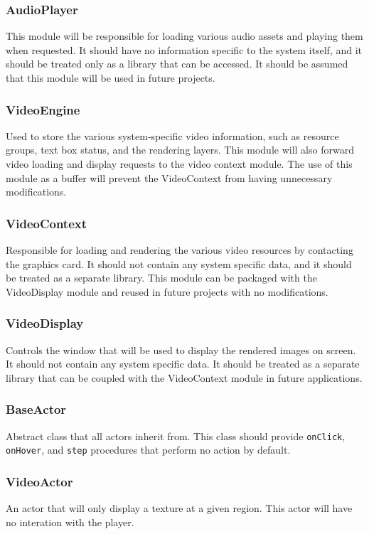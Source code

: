 \documentclass{article}
\begin{document}
    \subsubsection{AudioPlayer}
      This module will be responsible for loading various audio assets and playing them when requested. It should have no information specific to the system itself, and it should be treated only as a library that can be accessed. It should be assumed that this module will be used in future projects.
    \subsubsection{VideoEngine}
      Used to store the various system-specific video information, such as resource groups, text box status, and the rendering layers. This module will also forward video loading and display requests to the video context module. The use of this module as a buffer will prevent the VideoContext from having unnecessary modifications.
    \subsubsection{VideoContext}
      Responsible for loading and rendering the various video resources by contacting the graphics card. It should not contain any system specific data, and it should be treated as a separate library. This module can be packaged with the VideoDisplay module and reused in future projects with no modifications.
    \subsubsection{VideoDisplay}
      Controls the window that will be used to display the rendered images on screen. It should not contain any system specific data. It should be treated as a separate library that can be coupled with the VideoContext module in future applications.
    \subsubsection{BaseActor}
    Abstract class that all actors inherit from. This class should provide \texttt{onClick}, \texttt{onHover}, and \texttt{step} procedures that perform no action by default.
    \subsubsection{VideoActor}
    An actor that will only display a texture at a given region. This actor will have no interation with the player.
\end{document}
